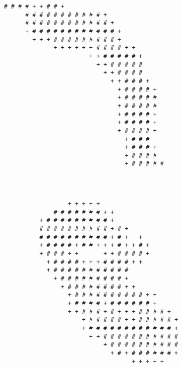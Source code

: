 \begin{multicols*}{2}
\begin{Verbatim}[samepage=true]
        # # # # + + # # +                               
      # # # # # # # # # # # +                           
      # # # # # # # # # # # # +                         
      + # # # # # # # # # # # # +                       
        + + + # # # # # # # # # +                       
              + + + + + + # # # # + +                   
                        + + # # # # # +                 
                          + + # # # # #                 
                            + + # # # #                 
                              + + # # # +               
                                + # # # # +             
                                + # # # # #             
                                + # # # # #             
                                + # # # # +             
                                + # # # # +             
                                + # # # # +             
                                  + # # #               
                                  + # # # +             
                                  + # # # #             
                                  + # # # # #           
                                                        
\end{Verbatim}
\begin{Verbatim}[samepage=true]
                                                        
                                                        
                  + + + + +                             
              # # # # # # # + +                         
          + # # # # # # # # # +                         
          # # # # # # # # # # + # +                     
          # # # # # # # # # # + # +   +                 
          + # # # # + # # + + + # + + # +               
          + # # # + +       + + # # # # +               
            + # # # # + + + # # # # + +                 
            + # # # # # # # # # # #                     
              + # # # # # # # # # +                     
                + # # # # # # # # + +                   
                  + # # # # # # # # # # + +             
                  + # # # # + # # # # # # +             
                  + + # # # + # + + + # # # # +         
                      + # # # # # + + # # # # # +       
                      + # # # # # # # # # # # # +       
                        + + # # # # # # # # # # #       
                            + # # # # # # # # # #       
                              + # + # # # # # # +       
                                    + + + + +           
                                                        

\end{Verbatim}
\end{multicols*}
